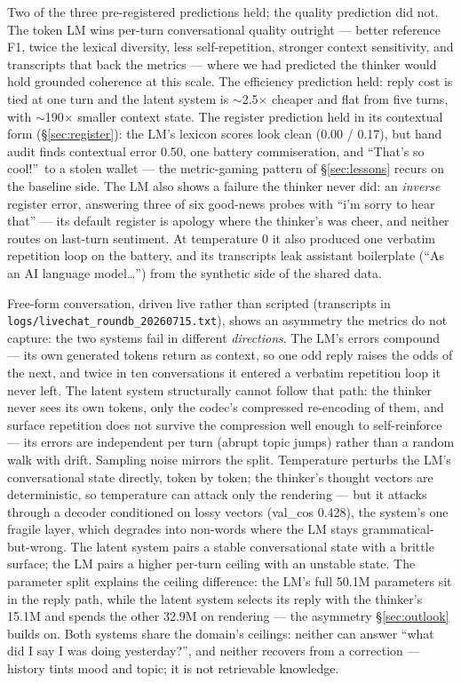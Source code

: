 \documentclass[11pt]{article}
\begin{document}
Two of the three pre-registered predictions held; the quality prediction
did not. The token
LM wins per-turn conversational quality outright --- better reference F1,
twice the lexical diversity, less self-repetition, stronger context
sensitivity, and transcripts that back the metrics --- where we had
predicted the thinker would hold grounded coherence at this scale.
The efficiency prediction held: reply cost is tied at one turn and the
latent system is $\sim$2.5$\times$ cheaper and flat from five turns, with
$\sim$190$\times$ smaller context state. The register prediction held
in its contextual form (\S\ref{sec:register}): the LM's lexicon scores
look clean (0.00 / 0.17), but hand audit finds
contextual error 0.50, one battery commiseration, and ``That's so cool!''\ to
a stolen wallet --- the metric-gaming pattern of \S\ref{sec:lessons}
recurs on the baseline side. The LM also shows a failure the thinker
never did: an \emph{inverse} register error, answering three of six
good-news probes with ``i'm sorry to hear that'' --- its default register
is apology where the thinker's was cheer, and neither routes on last-turn
sentiment. At temperature 0 it also produced one verbatim repetition loop
on the battery, and its transcripts leak assistant boilerplate (``As an AI
language model\ldots'') from the synthetic side of the shared data.

Free-form conversation, driven live rather than scripted (transcripts in
\nolinkurl{logs/livechat_roundb_20260715.txt}), shows an asymmetry the
metrics do not capture: the two systems fail in different \emph{directions}.
The LM's errors compound --- its own generated tokens return as context,
so one odd reply raises the odds of the next, and twice in ten
conversations it entered a verbatim repetition loop it never left. The
latent system structurally cannot follow that path: the thinker never sees
its own tokens, only the codec's compressed re-encoding of them, and
surface repetition does not survive the compression well enough to
self-reinforce --- its errors are independent per turn (abrupt topic
jumps) rather than a random walk with drift. Sampling noise mirrors the
split. Temperature perturbs the LM's conversational state directly, token
by token; the thinker's thought vectors are deterministic, so temperature
can attack only the rendering --- but it attacks through a decoder
conditioned on lossy vectors (val\_cos 0.428), the system's one fragile
layer, which degrades into non-words where the LM stays
grammatical-but-wrong. The latent system pairs a stable conversational
state with a brittle surface; the LM pairs a higher per-turn ceiling with
an unstable state.
The parameter split explains the ceiling difference: the LM's full 50.1M
parameters sit in the reply path, while the latent system selects its
reply with the thinker's 15.1M and spends the other 32.9M on rendering ---
the asymmetry
\S\ref{sec:outlook} builds on. Both systems share the domain's ceilings:
neither can answer ``what did I say I was doing yesterday?'', and neither
recovers from a correction --- history tints mood and topic; it is not
retrievable knowledge.
\end{document}
